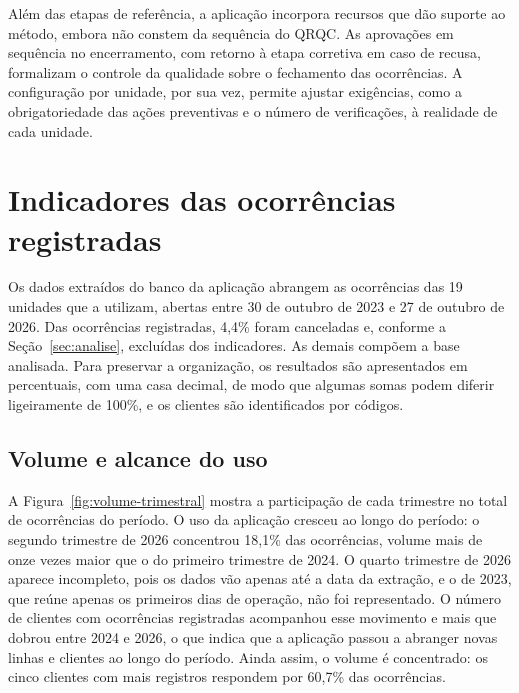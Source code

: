 Além das etapas de referência, a aplicação incorpora recursos que dão suporte ao método, embora não constem da sequência do QRQC. As aprovações em sequência no encerramento, com retorno à etapa corretiva em caso de recusa, formalizam o controle da qualidade sobre o fechamento das ocorrências. A configuração por unidade, por sua vez, permite ajustar exigências, como a obrigatoriedade das ações preventivas e o número de verificações, à realidade de cada unidade.

\section{Indicadores das ocorrências registradas}
\label{sec:indicadores}

Os dados extraídos do banco da aplicação abrangem as ocorrências das 19 unidades que a utilizam, abertas entre 30 de outubro de 2023 e 27 de outubro de 2026. Das ocorrências registradas, 4,4\% foram canceladas e, conforme a Seção~\ref{sec:analise}, excluídas dos indicadores. As demais compõem a base analisada. Para preservar a organização, os resultados são apresentados em percentuais, com uma casa decimal, de modo que algumas somas podem diferir ligeiramente de 100\%, e os clientes são identificados por códigos.

\subsection{Volume e alcance do uso}
\label{subsec:volume}

A Figura~\ref{fig:volume-trimestral} mostra a participação de cada trimestre no total de ocorrências do período. O uso da aplicação cresceu ao longo do período: o segundo trimestre de 2026 concentrou 18,1\% das ocorrências, volume mais de onze vezes maior que o do primeiro trimestre de 2024. O quarto trimestre de 2026 aparece incompleto, pois os dados vão apenas até a data da extração, e o de 2023, que reúne apenas os primeiros dias de operação, não foi representado. O número de clientes com ocorrências registradas acompanhou esse movimento e mais que dobrou entre 2024 e 2026, o que indica que a aplicação passou a abranger novas linhas e clientes ao longo do período. Ainda assim, o volume é concentrado: os cinco clientes com mais registros respondem por 60,7\% das ocorrências.

